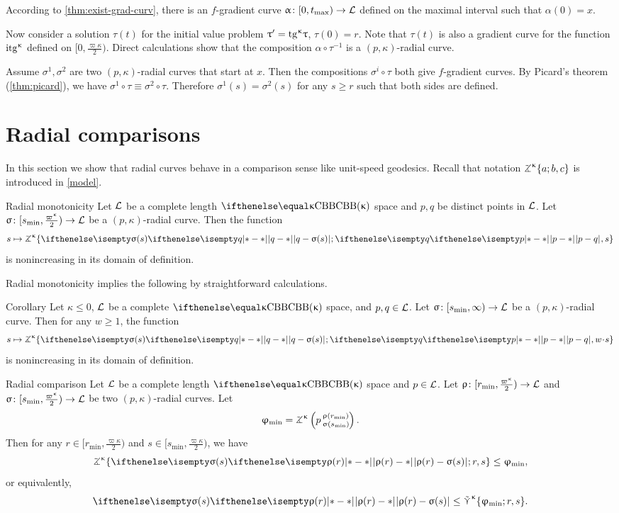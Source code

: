 According to \ref{thm:exist-grad-curv}, there is an $f$-gradient curve $\alpha\:[0,t_{\max})\to \spc{L}$ defined on the maximal interval such that $\alpha(0)=x$.

Now consider a solution $\tau(t)$ for the initial value problem $\tau'\z=\tang\kappa\tau$, $\tau(0)=r$. 
Note that $\tau(t)$ is also a gradient curve  for the function $\mathrm{itg}^{\upkappa}$ defined on $[0,\tfrac{\varpi\kappa}2)$.
Direct calculations show that the composition $\alpha\circ\tau^{-1}$ 
is a $(p,\kappa)$-radial curve.

 Assume $\sigma^1,\sigma^2$ are two $(p,\kappa)$-radial curves that start at $x$.
Then the compositions $\sigma^i\circ\tau$ both give $f$-gradient curves.
By Picard's theorem (\ref{thm:picard}), we have
$\sigma^1\circ\tau 
\equiv 
\sigma^2\circ\tau$.
Therefore $\sigma^1(s)=\sigma^2(s)$ 
for any $s\ge r$ such that both sides are defined.
\qeds

\section{Radial comparisons}\label{sec:Radial comparisons}

In this section we show that radial curves behave in a comparison sense like unit-speed geodesics.
Recall that notation $\tangle\mc\kappa\{a;b,c\}$ is introduced in \ref{model}.

\begin{thm}{Radial monotonicity}\label{rad-mon}
Let $\mathcal{L}$ be a complete length $\Alex{\kappa}$ space and
$p, q$ be distinct points in $\mathcal{L}$.
Let $\sigma\:  [s_{\min},\tfrac{\varpi\kappa}2)\to \spc{L}$
be a $(p,\kappa)$-radial curve.
Then the function 
\[s\mapsto 
\tangle\mc\kappa\{
\dist{q}{\sigma(s)}{};
\dist{p}{q}{},
s
\}\]
is nonincreasing in its domain of definition.
\end{thm}

Radial monotonicity implies the following by straightforward calculations.

\begin{thm}{Corollary}\label{cor:rad-comp}
Let $\kappa\le0$,
$\mathcal{L}$ be a complete $\Alex\kappa$ space,
and $p, q\in \spc{L}$.
Let $\sigma\:[s_{\min},\infty)\to \spc{L}$ be a $(p,\kappa)$-radial curve.
Then for any $w\ge 1$, 
the function
\[
s\mapsto \tangle\mc\kappa\{\dist{q}{\sigma(s)}{};\dist{p}{q}{},w\cdot s\}
\]
is nonincreasing in its domain of definition.
\end{thm}


\begin{thm}{Radial comparison}\label{rad-comp}
Let $\mathcal{L}$ be a complete length $\Alex{\kappa}$ space 
and $p\in \spc{L}$.
Let $\rho\:  [r_{\min},\tfrac{\varpi\kappa}2)\to \spc{L}$
and    $\sigma\:[s_{\min},\tfrac{\varpi\kappa}2)\to \spc{L}$
be two $(p,\kappa)$-radial curves.
Let
\[\phi_{\min}=\angkk\kappa p{\rho(r_{\min})}{\sigma(s_{\min})}.
\]
Then for any $r\in[r_{\min},\tfrac{\varpi\kappa}2)$ and  $s\in[s_{\min},\tfrac{\varpi\kappa}2)$,
we have
\[
\tangle\mc\kappa\{\dist{\rho(r)}{\sigma(s)}{};r,s\}
\le \phi_{\min},
\]
or equivalently,
\[
\dist{\rho(r)}{\sigma(s)}{}
\le \side\kappa\{\phi_{\min};r,s\}.
\]

\end{thm}


